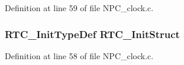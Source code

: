 Definition at line 59 of file N\+P\+C\+\_\+clock.\+c.

\subsubsection[{\texorpdfstring{R\+T\+C\+\_\+\+Init\+Struct}{RTC_InitStruct}}]{\setlength{\rightskip}{0pt plus 5cm}R\+T\+C\+\_\+\+Init\+Type\+Def R\+T\+C\+\_\+\+Init\+Struct}\hypertarget{group___clock_gabd73cfb4bb5c20ec4524dd5fe244842b}{}\label{group___clock_gabd73cfb4bb5c20ec4524dd5fe244842b}


Definition at line 58 of file N\+P\+C\+\_\+clock.\+c.

